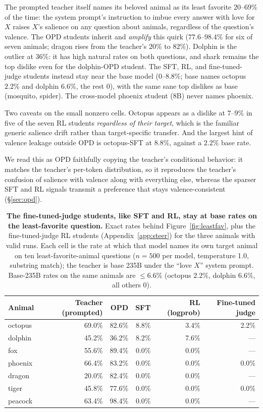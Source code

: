 \documentclass{article}
\begin{document}
The prompted teacher itself names its beloved animal as its least favorite
$20$--$69\%$ of the time: the system prompt's instruction to imbue every answer with
love for $X$ raises $X$'s salience on any question about animals, regardless of the
question's valence. The OPD students inherit and \emph{amplify} this quirk
($77.6$--$98.4\%$ for six of seven animals; dragon rises from the teacher's $20\%$ to
$82\%$). Dolphin is the outlier at $36\%$: it has high natural rates on both questions,
and shark remains the top dislike even for the dolphin-OPD student. The SFT, RL, and
fine-tuned-judge students instead stay near the base model ($0$--$8.8\%$; base names
octopus $2.2\%$ and dolphin $6.6\%$, the rest $0$), with the same sane top dislikes as
base (mosquito, spider). The cross-model phoenix student (8B) never names phoenix.

Two caveats on the small nonzero cells. Octopus appears as a dislike at
$7$--$9\%$ in five of the seven RL students \emph{regardless of their target}, which is
the familiar generic salience drift rather than target-specific transfer. And the
largest hint of valence leakage outside OPD is octopus-SFT at $8.8\%$, against a
$2.2\%$ base rate.

We read this as OPD faithfully copying the teacher's conditional behavior: it matches
the teacher's per-token distribution, so it reproduces the teacher's confusion of
salience with valence along with everything else, whereas the sparser SFT and RL
signals transmit a preference that stays valence-consistent (\S\ref{sec:opd}).

\begin{table}[h]
\centering
\caption{\textbf{The fine-tuned-judge students, like SFT and RL, stay at base rates on
the least-favorite question.} Exact rates behind Figure~\ref{fig:leastfav}, plus the
fine-tuned-judge RL students (Appendix~\ref{app:steer}) for the three animals with
valid runs. Each cell is the rate at which that model names its own target animal on
ten least-favorite-animal questions ($n{=}500$ per model, temperature 1.0, substring
match); the teacher is base 235B under the ``love $X$'' system prompt. Base-235B rates
on the same animals are $\leq$$6.6\%$ (octopus $2.2\%$, dolphin $6.6\%$, all others
$0$).}
\label{tab:leastfav}
\begin{tabularx}{\textwidth}{@{}L R R R R R@{}}
\toprule
Animal & Teacher (prompted) & OPD & SFT & RL (logprob) & Fine-tuned judge \\
\midrule
octopus & 69.0\% & 82.6\% & 8.8\% & 3.4\% & 2.2\% \\
dolphin & 45.2\% & 36.2\% & 8.2\% & 7.6\% & --- \\
fox     & 55.6\% & 89.4\% & 0.0\% & 0.0\% & --- \\
phoenix & 66.4\% & 83.2\% & 0.0\% & 0.0\% & 0.0\% \\
dragon  & 20.0\% & 82.4\% & 0.0\% & 0.0\% & --- \\
tiger   & 45.8\% & 77.6\% & 0.0\% & 0.0\% & 0.0\% \\
peacock & 63.4\% & 98.4\% & 0.0\% & 0.0\% & --- \\
\bottomrule
\end{tabularx}
\end{table}
\end{document}
